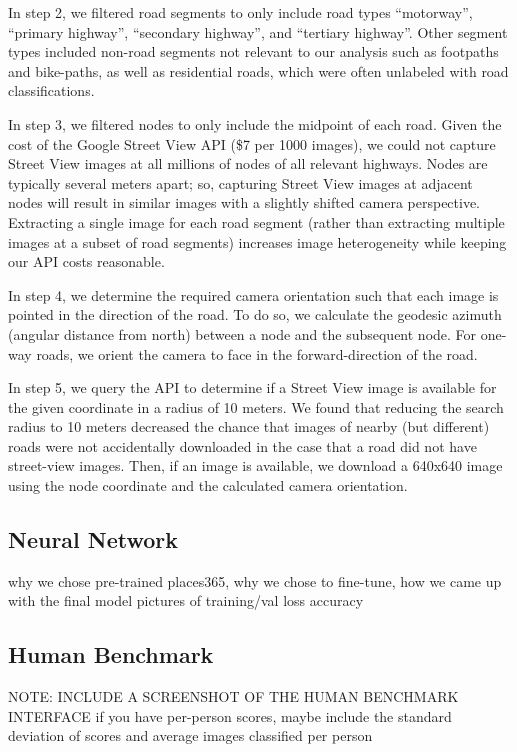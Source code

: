 \documentclass[10pt,twocolumn,letterpaper]{article}
\begin{document}
In step 2, we filtered road segments to only include road types ``motorway'', ``primary highway'', ``secondary highway'', and ``tertiary highway''. Other segment types included non-road segments not relevant to our analysis such as footpaths and bike-paths, as well as residential roads, which were often unlabeled with road classifications.

In step 3, we filtered nodes to only include the midpoint of each road. Given the cost of the Google Street View API (\$7 per 1000 images), we could not capture Street View images at all millions of nodes of all relevant highways. Nodes are typically several meters apart; so, capturing Street View images at adjacent nodes will result in similar images with a slightly shifted camera perspective. Extracting a single image for each road segment (rather than extracting multiple images at a subset of road segments) increases image heterogeneity while keeping our API costs reasonable.

In step 4, we determine the required camera orientation such that each image is pointed in the direction of the road. To do so, we calculate the geodesic azimuth (angular distance from north) between a node and the subsequent node. For one-way roads, we orient the camera to face in the forward-direction of the road.

In step 5, we query the API to determine if a Street View image is available for the given coordinate in a radius of 10 meters. We found that reducing the search radius to 10 meters decreased the chance that images of nearby (but different) roads were not accidentally downloaded in the case that a road did not have street-view images. Then, if an image is available, we download a 640x640 image using the node coordinate and the calculated camera orientation.

\subsection{Neural Network}
why we chose pre-trained places365, why we chose to fine-tune, how we came up with the final model
pictures of training/val loss accuracy

\subsection{Human Benchmark}
NOTE: INCLUDE A SCREENSHOT OF THE HUMAN BENCHMARK INTERFACE
if you have per-person scores, maybe include the standard deviation of scores and average images classified per person
\end{document}
